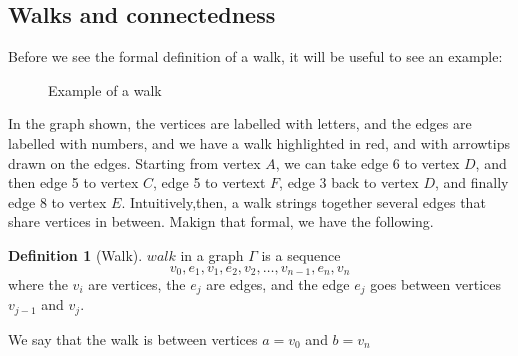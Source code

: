 \documentclass[10pt,]{book}
\theoremstyle{plain}
\theoremstyle{definition}
\newtheorem{definition}[theorem]{Definition}
\theoremstyle{definition}
\theoremstyle{definition}
\theoremstyle{definition}
\numberwithin{equation}{section}
\begin{document}
\subsection[{Walks and connectedness}]{Walks and connectedness}\label{subsection-14}
\hypertarget{p-87}{}%
Before we see the formal definition of a walk, it will be useful to see an example:%
\begin{figure}
\centering
{
}
\caption{Example of a walk\label{fig_walkdrawing}}
\end{figure}
\hypertarget{p-88}{}%
In the graph shown, the vertices are labelled with letters, and the edges are labelled with numbers, and we have a walk highlighted in red, and with arrowtips drawn on the edges.  Starting from vertex \(A\), we can take edge 6 to vertex \(D\), and then edge 5 to vertex \(C\), edge 5 to vertext \(F\), edge 3 back to vertex \(D\), and finally edge 8 to vertex \(E\). Intuitively,then, a walk strings together several edges that share vertices in between.  Makign that formal, we have the following.%
\begin{definition}[{Walk}]\label{definition-10}
\hypertarget{p-89}{}%
\(walk\) in a graph \(\Gamma\) is a sequence%
%
\begin{equation*}
v_0, e_1, v_1,e_2, v_2,\dots, v_{n-1}, e_n, v_n
\end{equation*}
\hypertarget{p-90}{}%
where the \(v_i\) are vertices, the \(e_j\) are edges, and the edge \(e_j\) goes between vertices \(v_{j-1}\) and \(v_j\).%
\par
\hypertarget{p-91}{}%
We say that the walk is between vertices \(a=v_0\) and \(b=v_n\)%
\end{definition}
\end{document}
